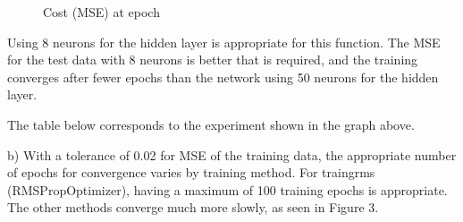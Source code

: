 \documentclass[11pt]{article}
\begin{document}
\begin{enumerate}
\begin{figure}[h!]
\begin{minipage}{0.45\textwidth}
        \caption{Cost (MSE) at epoch}
    \end{minipage}
\end{figure}\newline
Using 8 neurons for the hidden layer is appropriate for this function. The MSE for the test data with 8 neurons is better that is required, and the training converges after fewer epochs than the network using 50 neurons for the hidden layer.\newline
\newline

The table below corresponds to the experiment shown in the graph above.\newline



b) With a tolerance of 0.02 for MSE of the training data, the appropriate number of epochs for convergence varies by training method. For traingrms (RMSPropOptimizer), having a maximum of 100 training epochs is appropriate. The other methods converge much more slowly, as seen in Figure 3. \newline


\end{enumerate}
\end{document}
